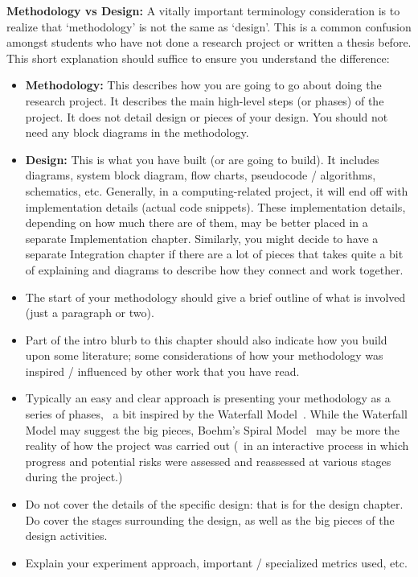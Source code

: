 \textbf{Methodology vs Design:} A vitally important terminology consideration is to realize that `methodology' is not the same as `design'.  This is a common confusion amongst students who have not done a research project or written a thesis before. This short explanation should suffice to ensure you understand the difference:

\begin{itemize}
  \item \textbf{Methodology:} This describes how you are going to go about doing the research project. It describes the main high-level steps (or phases) of the project. It does not detail design or pieces of your design. You should not need any block diagrams in the methodology.

  \item \textbf{Design:} This is what you have built (or are going to build). It includes diagrams, system block diagram, flow charts, pseudocode / algorithms, schematics, etc.  Generally, in a computing-related project, it will end off with implementation details (actual code snippets).  These implementation details, depending on how much there are of them, may be better placed in a separate Implementation chapter.  Similarly, you might decide to have a separate Integration chapter if there are a lot of pieces that takes quite a bit of explaining and diagrams to describe how they connect and work together.
\end{itemize}


\begin{itemize}
  \item The start of your methodology should give a brief outline of what is involved (just a paragraph or two).

  \item Part of the intro blurb to this chapter should also indicate how you build upon some literature; some considerations of how your methodology was inspired / influenced by other work that you have read.

  \item Typically an easy and clear approach is presenting your methodology as a series of phases, \ie~a bit inspired by the Waterfall Model~\cite{Royce_1970}.  While the Waterfall Model may suggest the big pieces, Boehm's Spiral Model~\cite{Boehm_1988} may be more the reality of how the project was carried out (\ie~in an interactive process in which progress and potential risks were assessed and reassessed at various stages during the project.)

  \item Do not cover the details of the specific design: that is for the design chapter.  Do cover the stages surrounding the design, as well as the big pieces of the design activities.

  \item Explain your experiment approach, important / specialized metrics used, etc.
\end{itemize}


